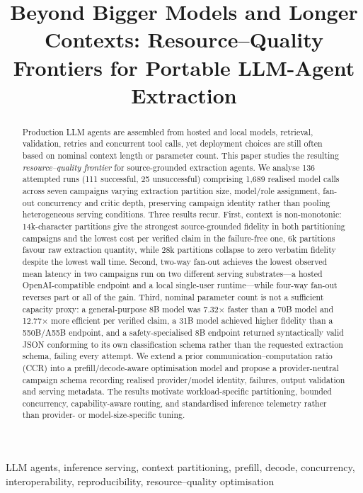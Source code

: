 \documentclass[conference]{IEEEtran}
\title{Beyond Bigger Models and Longer Contexts: Resource--Quality Frontiers for Portable LLM-Agent Extraction}
\author{
\IEEEauthorblockN{Manal Helal}
\IEEEauthorblockA{
School of Physics, Engineering and Computer Science\\
University of Hertfordshire\\
Hatfield, United Kingdom\\
m.helal@herts.ac.uk
}
}
\begin{document}
\maketitle

\begin{abstract}
Production LLM agents are assembled from hosted and local models, retrieval, validation, retries and concurrent tool calls, yet deployment choices are still often based on nominal context length or parameter count. This paper studies the resulting \emph{resource--quality frontier} for source-grounded extraction agents. We analyse 136 attempted runs (111 successful, 25 unsuccessful) comprising 1{,}689 realised model calls across seven campaigns varying extraction partition size, model/role assignment, fan-out concurrency and critic depth, preserving campaign identity rather than pooling heterogeneous serving conditions. Three results recur. First, context is non-monotonic: 14k-character partitions give the strongest source-grounded fidelity in both partitioning campaigns and the lowest cost per verified claim in the failure-free one, 6k partitions favour raw extraction quantity, while 28k partitions collapse to zero verbatim fidelity despite the lowest wall time. Second, two-way fan-out achieves the lowest observed mean latency in two campaigns run on two different serving substrates---a hosted OpenAI-compatible endpoint and a local single-user runtime---while four-way fan-out reverses part or all of the gain. Third, nominal parameter count is not a sufficient capacity proxy: a general-purpose 8B model was 7.32$\times$ faster than a 70B model and 12.77$\times$ more efficient per verified claim, a 31B model achieved higher fidelity than a 550B/A55B endpoint, and a safety-specialised 8B endpoint returned syntactically valid JSON conforming to its own classification schema rather than the requested extraction schema, failing every attempt. We extend a prior communication--computation ratio (CCR) into a prefill/decode-aware optimisation model and propose a provider-neutral campaign schema recording realised provider/model identity, failures, output validation and serving metadata. The results motivate workload-specific partitioning, bounded concurrency, capability-aware routing, and standardised inference telemetry rather than provider- or model-size-specific tuning.
\end{abstract}

\begin{IEEEkeywords}
LLM agents, inference serving, context partitioning, prefill, decode, concurrency, interoperability, reproducibility, resource--quality optimisation
\end{IEEEkeywords}
\end{document}
